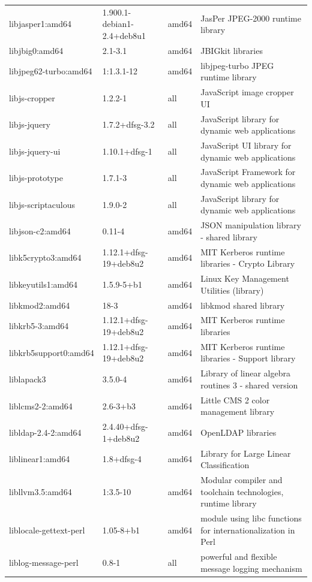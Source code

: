 \documentclass[a4paper,10pt]{article}
\begin{document}
\begin{appendices}
{\begin{longtable}{p{3.25cm}@{\hspace{0.25cm}}p{4cm}@{\hspace{0.25cm}}l@{\hspace{0.25cm}}p{7cm}}
libjasper1:amd64	&	1.900.1-debian1-2.4+deb8u1	&	amd64	&	JasPer JPEG-2000 runtime library	\\
libjbig0:amd64	&	2.1-3.1	&	amd64	&	JBIGkit libraries	\\
libjpeg62-turbo:amd64	&	1:1.3.1-12	&	amd64	&	libjpeg-turbo JPEG runtime library	\\
libjs-cropper	&	1.2.2-1	&	all	&	JavaScript image cropper UI	\\
libjs-jquery	&	1.7.2+dfsg-3.2	&	all	&	JavaScript library for dynamic web applications	\\
libjs-jquery-ui	&	1.10.1+dfsg-1	&	all	&	JavaScript UI library for dynamic web applications	\\
libjs-prototype	&	1.7.1-3	&	all	&	JavaScript Framework for dynamic web applications	\\
libjs-scriptaculous	&	1.9.0-2	&	all	&	JavaScript library for dynamic web applications	\\
libjson-c2:amd64	&	0.11-4	&	amd64	&	JSON manipulation library - shared library	\\
libk5crypto3:amd64	&	1.12.1+dfsg-19+deb8u2	&	amd64	&	MIT Kerberos runtime libraries - Crypto Library	\\
libkeyutils1:amd64	&	1.5.9-5+b1	&	amd64	&	Linux Key Management Utilities (library)	\\
libkmod2:amd64	&	18-3	&	amd64	&	libkmod shared library	\\
libkrb5-3:amd64	&	1.12.1+dfsg-19+deb8u2	&	amd64	&	MIT Kerberos runtime libraries	\\
libkrb5support0:amd64	&	1.12.1+dfsg-19+deb8u2	&	amd64	&	MIT Kerberos runtime libraries - Support library	\\
liblapack3	&	3.5.0-4	&	amd64	&	Library of linear algebra routines 3 - shared version	\\
liblcms2-2:amd64	&	2.6-3+b3	&	amd64	&	Little CMS 2 color management library	\\
libldap-2.4-2:amd64	&	2.4.40+dfsg-1+deb8u2	&	amd64	&	OpenLDAP libraries	\\
liblinear1:amd64	&	1.8+dfsg-4	&	amd64	&	Library for Large Linear Classification	\\
libllvm3.5:amd64	&	1:3.5-10	&	amd64	&	Modular compiler and toolchain technologies, runtime library	\\
liblocale-gettext-perl	&	1.05-8+b1	&	amd64	&	module using libc functions for internationalization in Perl	\\
liblog-message-perl	&	0.8-1	&	all	&	powerful and flexible message logging mechanism	\\

\end{longtable}}
\end{appendices}
\end{document}
